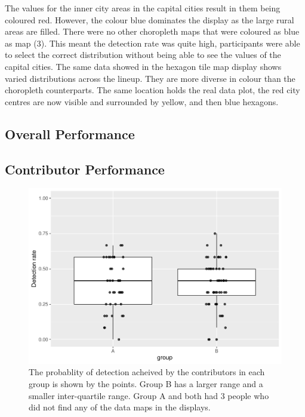 \documentclass[conference,final,]{IEEEtran}
\makeatletter
\def\maxwidth{\ifdim\Gin@nat@width>\linewidth\linewidth
\else\Gin@nat@width\fi}
\let\Oldincludegraphics\includegraphics
\renewcommand{\includegraphics}[1]{\Oldincludegraphics[width=\maxwidth]{#1}}
\makeatother
\begin{document}
The values for the inner city areas in the capital cities result in them being coloured red. However, the colour blue dominates the display as the large rural areas are filled. There were no other choropleth maps that were coloured as blue as map (3). This meant the detection rate was quite high, participants were able to select the correct distribution without being able to see the values of the capital cities.
The same data showed in the hexagon tile map display shows varied distributions across the lineup. They are more diverse in colour than the choropleth counterparts. The same location holds the real data plot, the red city centres are now visible and surrounded by yellow, and then blue hexagons.

\hypertarget{overall-performance}{%
\subsection{Overall Performance}\label{overall-performance}}

\hypertarget{contributor-performance}{%
\subsection{Contributor Performance}\label{contributor-performance}}

\begin{figure}
\centering
\includegraphics{paper_files/figure-latex/contributors-1.pdf}
\caption{\label{fig:contributors}The probablity of detection acheived by the contributors in each group is shown by the points. Group B has a larger range and a smaller inter-quartile range. Group A and both had 3 people who did not find any of the data maps in the displays.}
\end{figure}
\end{document}
